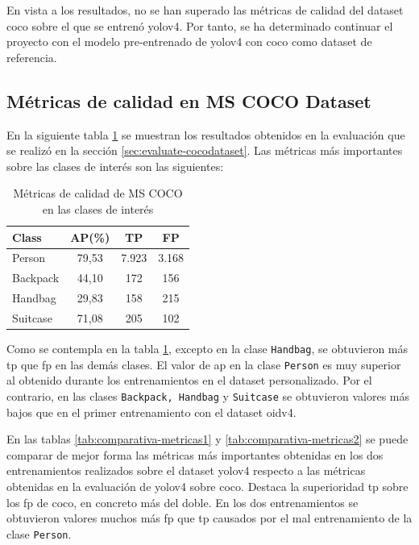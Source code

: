 En vista a los resultados, no se han superado las métricas de calidad del dataset \gls{coco} sobre el que se entrenó \gls{yolov4}. Por tanto, se ha determinado continuar el proyecto con el modelo pre-entrenado de \gls{yolov4} con \gls{coco} como dataset de referencia.

\subsection{Métricas de calidad en MS COCO Dataset}
\label{subsec:metricas-calidad-coco}

En la siguiente tabla \ref{tab:metricas-clases-coco} se muestran los resultados obtenidos en la evaluación que se realizó en la sección \ref{sec:evaluate-cocodataset}. Las métricas más importantes sobre las clases de interés son las siguientes:

\begin{table}[ht]
\centering
\caption{Métricas de calidad de MS COCO en las clases de interés}
\label{tab:metricas-clases-coco}
\begin{tabular}{lccc}
\hline
\textbf{Class} & \textbf{AP(\%)} & \textbf{TP} & \textbf{FP} \\ \hline
Person         & 79,53           & 7.923       & 3.168       \\
Backpack       & 44,10           & 172         & 156         \\
Handbag        & 29,83           & 158         & 215         \\
Suitcase       & 71,08           & 205         & 102         \\ \hline
\end{tabular}
\end{table}

Como se contempla en la tabla \ref{tab:metricas-clases-coco}, excepto en la clase \texttt{Handbag}, se obtuvieron más \gls{tp} que \gls{fp} en las demás clases. El valor de \gls{ap} en la clase \texttt{Person} es muy superior al obtenido durante los entrenamientos en el dataset personalizado. Por el contrario, en las clases \texttt{Backpack, Handbag} y \texttt{Suitcase} se obtuvieron valores más bajos que en el primer entrenamiento con el dataset \gls{oidv4}.

En las tablas \ref{tab:comparativa-metricas1} y \ref{tab:comparativa-metricas2} se puede comparar de mejor forma las métricas más importantes obtenidas en los dos entrenamientos realizados sobre el dataset \gls{yolov4} respecto a las métricas obtenidas en la evaluación de \gls{yolov4} sobre \gls{coco}. Destaca la superioridad \gls{tp} sobre los \gls{fp} de \gls{coco}, en concreto más del doble. En los dos entrenamientos se obtuvieron valores muchos más \gls{fp} que \gls{tp} causados por el mal entrenamiento de la clase \texttt{Person}.

